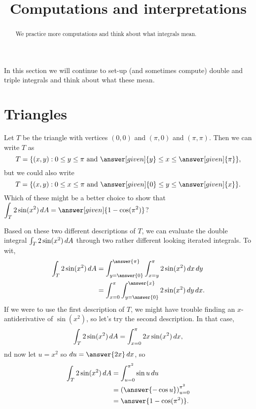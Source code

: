 \documentclass{ximera}
\title[Dig-In:]{Computations and interpretations}
\begin{document}
\begin{abstract}
  We practice more computations and think about what integrals mean.
\end{abstract}
\maketitle

In this section we will continue to set-up (and sometimes compute)
double and triple integrals and think about what these mean.

\section{Triangles}

\begin{example}
  Let $T$ be the triangle with vertices $(0,0)$ and $(\pi,0)$ and
  $(\pi,\pi)$.  Then we can write $T$ as
  \[
  T = \{ (x,y)  : 0 \leq y \leq \pi \text{ and } \answer[given]{y} \leq x \leq \answer[given]{\pi} \},
  \]
  but we could also write
  \[
    T = \{ (x,y)  : 0 \leq x \leq \pi \text{ and } \answer[given]{0} \leq y \leq \answer[given]{x} \}.
  \]
  Which of these might be a better choice to show that $\displaystyle\int_T 2 \sin (x^2) \d A = \answer[given]{1 - \cos(\pi^2)}$?
  
  \begin{explanation}
    Based on these two different descriptions of $T$, we can evaluate
    the double integral $\int_T 2 \sin (x^2) \mathop{}\!d A$ through two rather
    different looking iterated integrals.  To wit,
    \begin{align*}
      \int_T 2 \sin (x^2) \d A 
      &= \int_{y = \answer{0}}^{\answer{\pi}} \int_{x = y}^\pi 2 \sin (x^2) \d x \d y \\
      &= \int_{x = 0}^\pi \int_{y = \answer{0}}^{\answer{x}} 2 \sin (x^2) \d y \d x.
    \end{align*}
    If we were to use the first description of $T$, we might have
    trouble finding an $x$-antiderivative of $\sin (x^2)$, so let's
    try the second description.  In that case,
    \[
      \int_T 2 \sin (x^2) \mathop{}\!d A = \int_{x = 0}^\pi 2 x \sin (x^2) \mathop{}\!d x,
    \]
    nd now let $u = x^2$ so $du = \answer{2x} \d x$, so 
    \begin{align*}
      \int_T 2 \sin (x^2) \d A 
      &= \int_{u = 0}^{\pi^2} \sin u \d u \\
      &= \left( \answer{- \cos u} \right)_{u=0}^{\pi^2} \\
      &= \answer{1 - \cos (\pi^2)}.
    \end{align*}
  \end{explanation}
\end{example}
\end{document}
